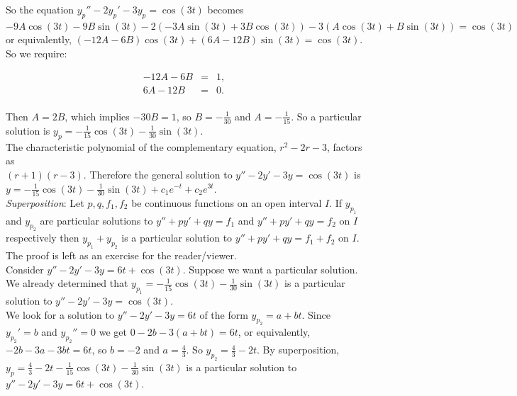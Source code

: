 \documentclass{ximera}
\begin{document}
So the equation $y_p''-2y_p'-3y_p=\cos{(3t)}$ becomes \\$-9A\cos{(3t)}-9B\sin{(3t)}-2(-3A\sin{(3t)}+3B\cos{(3t)})-3(A\cos{(3t)}+B\sin{(3t)})=\cos{(3t)}$\\ or equivalently, $(-12A-6B)\cos{(3t)}+(6A-12B)\sin{(3t)}=\cos{(3t)}$.  So we require:

 \begin{eqnarray*}
  -12A-6B &=& 1, \\
  6A-12B &=& 0.\\
 \end{eqnarray*}

 Then $A=2B$, which implies $-30B=1$, so $B=-\frac{1}{30}$  and $A=-\frac{1}{15}$.  So a particular solution is $y_p=-\frac{1}{15}\cos{(3t)}-\frac{1}{30}\sin{(3t)}$.\\

The characteristic polynomial of the complementary equation, $r^2-2r-3$, factors as\\ $(r+1)(r-3)$.  Therefore the general solution to $y''-2y'-3y=\cos{(3t)}$ is \\ $y=-\frac{1}{15}\cos{(3t)}-\frac{1}{30}\sin{(3t)}+c_1e^{-t}+c_2e^{3t}$.\\


 \emph{Superposition}:  Let $p,q,f_1,f_2$ be continuous functions on an open interval $I$.  If $y_{p_1}$ and $y_{p_2}$ are particular solutions to $y''+py'+qy=f_1$ and $y''+py'+qy=f_2$ on $I$ respectively then $y_{p_1}+y_{p_2}$ is a particular solution to $y''+py'+qy=f_1+f_2$ on $I$.\\

The proof is left as an exercise for the reader/viewer.\\


Consider $y''-2y'-3y=6t+\cos{(3t)}$.  Suppose we want a particular solution.  We already determined that $y_{p_1}=-\frac{1}{15}\cos{(3t)}-\frac{1}{30}\sin{(3t)}$ is a particular solution to $y''-2y'-3y=\cos{(3t)}$.\\

We look for a solution to $y''-2y'-3y=6t$ of the form $y_{p_2}=a+bt$.  Since $y_{p_2}'=b$ and $y_{p_2}''=0$ we get $0-2b-3(a+bt)=6t$, or equivalently, $-2b-3a-3bt=6t$, so $b=-2$ and $a=\frac{4}{3}$.  So $y_{p_2}=\frac{4}{3}-2t$.  By superposition, $y_p=\frac{4}{3}-2t-\frac{1}{15}\cos{(3t)}-\frac{1}{30}\sin{(3t)}$ is a particular solution to $y''-2y'-3y=6t+\cos{(3t)}$.
\end{document}
